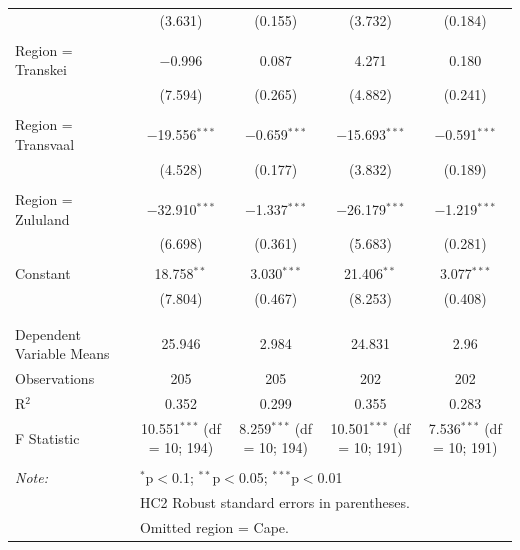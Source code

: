 \begin{table}[!htbp]
\begin{tabular}{@{\extracolsep{5pt}}lcccc}
  & (3.631) & (0.155) & (3.732) & (0.184) \\ 
  & & & & \\ 
 Region = Transkei & $-$0.996 & 0.087 & 4.271 & 0.180 \\ 
  & (7.594) & (0.265) & (4.882) & (0.241) \\ 
  & & & & \\ 
 Region = Transvaal & $-$19.556$^{***}$ & $-$0.659$^{***}$ & $-$15.693$^{***}$ & $-$0.591$^{***}$ \\ 
  & (4.528) & (0.177) & (3.832) & (0.189) \\ 
  & & & & \\ 
 Region = Zululand & $-$32.910$^{***}$ & $-$1.337$^{***}$ & $-$26.179$^{***}$ & $-$1.219$^{***}$ \\ 
  & (6.698) & (0.361) & (5.683) & (0.281) \\ 
  & & & & \\ 
 Constant & 18.758$^{**}$ & 3.030$^{***}$ & 21.406$^{**}$ & 3.077$^{***}$ \\ 
  & (7.804) & (0.467) & (8.253) & (0.408) \\ 
  & & & & \\ 
\hline \\[-1.8ex] 
Dependent Variable Means & 25.946 & 2.984 & 24.831 & 2.96 \\ 
Observations & 205 & 205 & 202 & 202 \\ 
R$^{2}$ & 0.352 & 0.299 & 0.355 & 0.283 \\ 
F Statistic & 10.551$^{***}$ (df = 10; 194) & 8.259$^{***}$ (df = 10; 194) & 10.501$^{***}$ (df = 10; 191) & 7.536$^{***}$ (df = 10; 191) \\ 
\hline 
\hline \\[-1.8ex] 
\textit{Note:}  & \multicolumn{4}{l}{$^{*}$p$<$0.1; $^{**}$p$<$0.05; $^{***}$p$<$0.01} \\ 
 & \multicolumn{4}{l}{HC2 Robust standard errors in parentheses.} \\ 
 & \multicolumn{4}{l}{Omitted region = Cape.} \\ 
\end{tabular} 
\end{table} 
